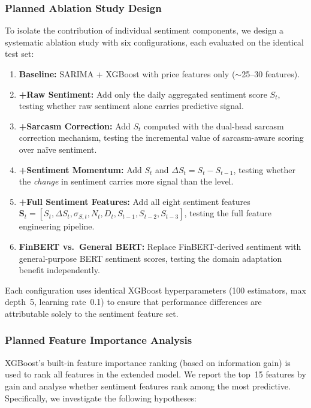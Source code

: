 \subsubsection{Planned Ablation Study Design}

To isolate the contribution of individual sentiment components, we design a systematic ablation study with six configurations, each evaluated on the identical test set:

\begin{enumerate}
    \item \textbf{Baseline:} SARIMA + XGBoost with price features only ($\sim$25--30 features).
    \item \textbf{+Raw Sentiment:} Add only the daily aggregated sentiment score $S_t$, testing whether raw sentiment alone carries predictive signal.
    \item \textbf{+Sarcasm Correction:} Add $S_t$ computed with the dual-head sarcasm correction mechanism, testing the incremental value of sarcasm-aware scoring over na\"ive sentiment.
    \item \textbf{+Sentiment Momentum:} Add $S_t$ and $\Delta S_t = S_t - S_{t-1}$, testing whether the \textit{change} in sentiment carries more signal than the level.
    \item \textbf{+Full Sentiment Features:} Add all eight sentiment features $\mathbf{S}_t = [S_t, \Delta S_t, \sigma_{S,t}, N_t, D_t, S_{t-1}, S_{t-2}, S_{t-3}]$, testing the full feature engineering pipeline.
    \item \textbf{FinBERT vs.\ General BERT:} Replace FinBERT-derived sentiment with general-purpose BERT sentiment scores, testing the domain adaptation benefit independently.
\end{enumerate}

Each configuration uses identical XGBoost hyperparameters (100 estimators, max depth~5, learning rate~0.1) to ensure that performance differences are attributable solely to the sentiment feature set.

\subsubsection{Planned Feature Importance Analysis}

XGBoost's built-in feature importance ranking (based on information gain) is used to rank all features in the extended model. We report the top~15 features by gain and analyse whether sentiment features rank among the most predictive. Specifically, we investigate the following hypotheses:

